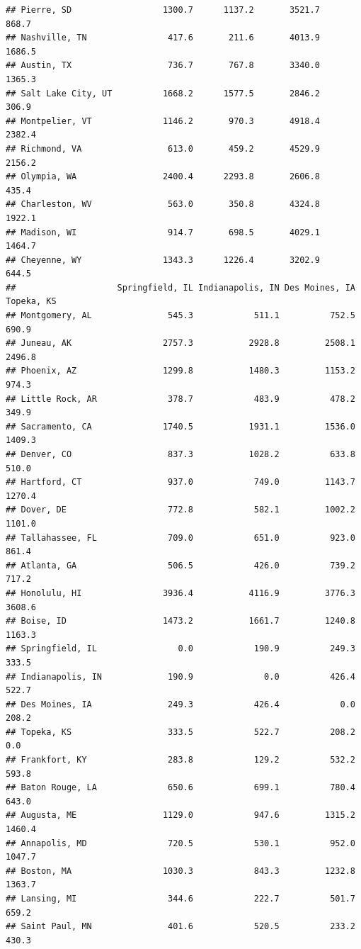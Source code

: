 \documentclass[
]{article}
\begin{document}
\begin{verbatim}
## Pierre, SD                  1300.7      1137.2       3521.7     868.7
## Nashville, TN                417.6       211.6       4013.9    1686.5
## Austin, TX                   736.7       767.8       3340.0    1365.3
## Salt Lake City, UT          1668.2      1577.5       2846.2     306.9
## Montpelier, VT              1146.2       970.3       4918.4    2382.4
## Richmond, VA                 613.0       459.2       4529.9    2156.2
## Olympia, WA                 2400.4      2293.8       2606.8     435.4
## Charleston, WV               563.0       350.8       4324.8    1922.1
## Madison, WI                  914.7       698.5       4029.1    1464.7
## Cheyenne, WY                1343.3      1226.4       3202.9     644.5
##                    Springfield, IL Indianapolis, IN Des Moines, IA Topeka, KS
## Montgomery, AL               545.3            511.1          752.5      690.9
## Juneau, AK                  2757.3           2928.8         2508.1     2496.8
## Phoenix, AZ                 1299.8           1480.3         1153.2      974.3
## Little Rock, AR              378.7            483.9          478.2      349.9
## Sacramento, CA              1740.5           1931.1         1536.0     1409.3
## Denver, CO                   837.3           1028.2          633.8      510.0
## Hartford, CT                 937.0            749.0         1143.7     1270.4
## Dover, DE                    772.8            582.1         1002.2     1101.0
## Tallahassee, FL              709.0            651.0          923.0      861.4
## Atlanta, GA                  506.5            426.0          739.2      717.2
## Honolulu, HI                3936.4           4116.9         3776.3     3608.6
## Boise, ID                   1473.2           1661.7         1240.8     1163.3
## Springfield, IL                0.0            190.9          249.3      333.5
## Indianapolis, IN             190.9              0.0          426.4      522.7
## Des Moines, IA               249.3            426.4            0.0      208.2
## Topeka, KS                   333.5            522.7          208.2        0.0
## Frankfort, KY                283.8            129.2          532.2      593.8
## Baton Rouge, LA              650.6            699.1          780.4      643.0
## Augusta, ME                 1129.0            947.6         1315.2     1460.4
## Annapolis, MD                720.5            530.1          952.0     1047.7
## Boston, MA                  1030.3            843.3         1232.8     1363.7
## Lansing, MI                  344.6            222.7          501.7      659.2
## Saint Paul, MN               401.6            520.5          233.2      430.3

\end{verbatim}
\end{document}
